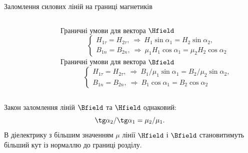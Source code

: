 \documentclass[onlytextwidth]{beamer}
\begin{document}
\begin{frame}{Заломлення силових ліній на границі магнетиків}{}
\begin{columns}
\begin{column}{0.55\linewidth}
		\end{column}
		\begin{column}{0.45\linewidth}\scriptsize
			Граничні умови для вектора $\Hfield$
			\begin{equation*}
				\begin{cases}
					H_{1\tau} = H_{2\tau},\ \Rightarrow\ H_1\sin\alpha_1 = H_2\sin\alpha_2, \\
					B_{1n} = B_{2n},\ \Rightarrow\ \mu_1H_1\cos\alpha_1 =
					\mu_2H_2\cos\alpha_2
				\end{cases}
			\end{equation*}
			Граничні умови для вектора $\Bfield$
			\begin{equation*}
				\begin{cases}
					H_{1\tau} = H_{2\tau},\ \Rightarrow\ B_1/\mu_1\sin\alpha_1 =
					B_2/\mu_2\sin\alpha_2, \\
					B_{1n} = B_{2n},\ \Rightarrow\ B_1\cos\alpha_1 =
					B_2\cos\alpha_2
				\end{cases}
			\end{equation*}
		\end{column}
	\end{columns}
	\begin{block}{}\justifying
		Закон заломлення ліній $\Bfield$ та $\Hfield$ однаковий:
		\begin{equation*}
			\tg\alpha_2 / \tg\alpha_1 = \mu_2 / \mu_1.
		\end{equation*}
		В діелектрику з більшим значенням $\mu$ лінії $\Hfield$ і $\Bfield$
		становитимуть більший кут із нормаллю до границі розділу.
	\end{block}
\end{frame}
\end{document}
